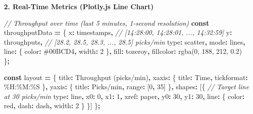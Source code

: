 \documentclass[
]{article}
\newenvironment{Shaded}{\begin{snugshade}}{\end{snugshade}}
\newcommand{\CommentTok}[1]{\textcolor[rgb]{0.56,0.35,0.01}{\textit{#1}}}
\newcommand{\DataTypeTok}[1]{\textcolor[rgb]{0.13,0.29,0.53}{#1}}
\newcommand{\DecValTok}[1]{\textcolor[rgb]{0.00,0.00,0.81}{#1}}
\newcommand{\KeywordTok}[1]{\textcolor[rgb]{0.13,0.29,0.53}{\textbf{#1}}}
\newcommand{\NormalTok}[1]{#1}
\newcommand{\OperatorTok}[1]{\textcolor[rgb]{0.81,0.36,0.00}{\textbf{#1}}}
\newcommand{\StringTok}[1]{\textcolor[rgb]{0.31,0.60,0.02}{#1}}
\begin{document}
\textbf{2. Real-Time Metrics (Plotly.js Line Chart)}

\begin{Shaded}
\begin{Highlighting}[]
\CommentTok{// Throughput over time (last 5 minutes, 1{-}second resolution)}
\KeywordTok{const}\NormalTok{ throughputData }\OperatorTok{=}\NormalTok{ \{}
  \DataTypeTok{x}\OperatorTok{:}\NormalTok{ timestamps}\OperatorTok{,}  \CommentTok{// [\textquotesingle{}14:28:00\textquotesingle{}, \textquotesingle{}14:28:01\textquotesingle{}, ..., \textquotesingle{}14:32:59\textquotesingle{}]}
  \DataTypeTok{y}\OperatorTok{:}\NormalTok{ throughputs}\OperatorTok{,}  \CommentTok{// [28.2, 28.5, 28.3, ..., 28.5] picks/min}
  \DataTypeTok{type}\OperatorTok{:} \StringTok{\textquotesingle{}scatter\textquotesingle{}}\OperatorTok{,}
  \DataTypeTok{mode}\OperatorTok{:} \StringTok{\textquotesingle{}lines\textquotesingle{}}\OperatorTok{,}
  \DataTypeTok{line}\OperatorTok{:}\NormalTok{ \{ }\DataTypeTok{color}\OperatorTok{:} \StringTok{\textquotesingle{}\#00BCD4\textquotesingle{}}\OperatorTok{,} \DataTypeTok{width}\OperatorTok{:} \DecValTok{2}\NormalTok{ \}}\OperatorTok{,}
  \DataTypeTok{fill}\OperatorTok{:} \StringTok{\textquotesingle{}tozeroy\textquotesingle{}}\OperatorTok{,}
  \DataTypeTok{fillcolor}\OperatorTok{:} \StringTok{\textquotesingle{}rgba(0, 188, 212, 0.2)\textquotesingle{}}
\NormalTok{\}}\OperatorTok{;}

\KeywordTok{const}\NormalTok{ layout }\OperatorTok{=}\NormalTok{ \{}
  \DataTypeTok{title}\OperatorTok{:} \StringTok{\textquotesingle{}Throughput (picks/min)\textquotesingle{}}\OperatorTok{,}
  \DataTypeTok{xaxis}\OperatorTok{:}\NormalTok{ \{ }\DataTypeTok{title}\OperatorTok{:} \StringTok{\textquotesingle{}Time\textquotesingle{}}\OperatorTok{,} \DataTypeTok{tickformat}\OperatorTok{:} \StringTok{\textquotesingle{}\%H:\%M:\%S\textquotesingle{}}\NormalTok{ \}}\OperatorTok{,}
  \DataTypeTok{yaxis}\OperatorTok{:}\NormalTok{ \{ }\DataTypeTok{title}\OperatorTok{:} \StringTok{\textquotesingle{}Picks/min\textquotesingle{}}\OperatorTok{,} \DataTypeTok{range}\OperatorTok{:}\NormalTok{ [}\DecValTok{0}\OperatorTok{,} \DecValTok{35}\NormalTok{] \}}\OperatorTok{,}
  \DataTypeTok{shapes}\OperatorTok{:}\NormalTok{ [\{  }\CommentTok{// Target line at 30 picks/min}
    \DataTypeTok{type}\OperatorTok{:} \StringTok{\textquotesingle{}line\textquotesingle{}}\OperatorTok{,} \DataTypeTok{x0}\OperatorTok{:} \DecValTok{0}\OperatorTok{,} \DataTypeTok{x1}\OperatorTok{:} \DecValTok{1}\OperatorTok{,} \DataTypeTok{xref}\OperatorTok{:} \StringTok{\textquotesingle{}paper\textquotesingle{}}\OperatorTok{,}
    \DataTypeTok{y0}\OperatorTok{:} \DecValTok{30}\OperatorTok{,} \DataTypeTok{y1}\OperatorTok{:} \DecValTok{30}\OperatorTok{,} \DataTypeTok{line}\OperatorTok{:}\NormalTok{ \{ }\DataTypeTok{color}\OperatorTok{:} \StringTok{\textquotesingle{}red\textquotesingle{}}\OperatorTok{,} \DataTypeTok{dash}\OperatorTok{:} \StringTok{\textquotesingle{}dash\textquotesingle{}}\OperatorTok{,} \DataTypeTok{width}\OperatorTok{:} \DecValTok{2}\NormalTok{ \}}
\NormalTok{  \}]}
\NormalTok{\}}\OperatorTok{;}


\end{Highlighting}
\end{Shaded}
\end{document}
